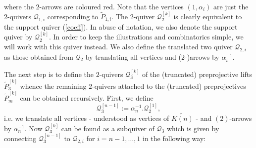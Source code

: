 \documentclass{amsart}
\numberwithin{equation}{section}
\newcommand{\cQ}{\mathcal{Q}}
\begin{document}
\\

\noindent
where the $2$-arrows are coloured red. Note that the vertices $(1,\alpha_i)$ are just the $2$-quivers $\cQ_{1,i}$ corresponding to $\tilde P_{1,i}$. The $2$-quiver $\mathcal Q_2^{[k]}$ is clearly equivalent to the support quiver (\ref{coeff}). In abuse of notation, we also denote the support quiver by $\mathcal Q_{2}^{[k]}$. In order to keep the illustrations and combinatorics simple, we will work with this quiver instead. We also define the translated two quiver $\cQ_{2,i}$ as those obtained from $\cQ_{2}$ by translating all vertices and ($2$-)arrows by $\alpha_i^{-1}$.

The next step is to define the $2$-quivers $\cQ^{[k]}_3$ of the (truncated) preprojective lifts $\tilde P^{[k]}_3$ whence the remaining $2$-quivers attached to the (truncated) preprojectives $\tilde P_m^{[k]}$ can be obtained recursively. First, we define
$$\cQ_3^{[n-1]}:=\alpha_{n}^{-1}.\cQ_2^{[1]},$$
i.e. we translate all vertices - understood as vertices of $\widetilde{K(n)}$ - and $(2)$-arrows by $\alpha_n^{-1}$. Now $\cQ_3^{[k]}$ can be found as a subquiver of $\cQ_{3}$ which is given by connecting $\cQ_3^{[n-1]}$ to $\cQ_{2,i}$ for $i=n-1,\ldots, 1$ in the following way: \\
\end{document}
